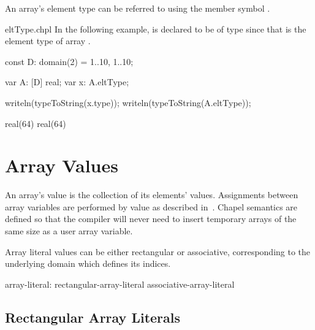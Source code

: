 %
%
An array's element type can be referred to using the member symbol
.

\begin{chapelexample}{eltType.chpl}
In the following example,  is declared to be of type
 since that is the element type of array .
\begin{chapelpre}
const D: domain(2) = {1..10, 1..10};
\end{chapelpre}
\begin{chapel}
var A: [D] real;
var x: A.eltType;
\end{chapel}
\begin{chapelpost}
writeln(typeToString(x.type));
writeln(typeToString(A.eltType));
\end{chapelpost}
\begin{chapeloutput}
real(64)
real(64)
\end{chapeloutput}
\end{chapelexample}

\section{Array Values}
\label{Array_Values}

An array's value is the collection of its elements' values.
Assignments between array variables are performed by value as
described in~.  Chapel semantics are defined so
that the compiler will never need to insert temporary arrays of the
same size as a user array variable.


Array literal values can be either rectangular or associative, corresponding to
the underlying domain which defines its indices. 

\begin{syntax}
array-literal:
  rectangular-array-literal
  associative-array-literal
\end{syntax}

\subsection{Rectangular Array Literals}

